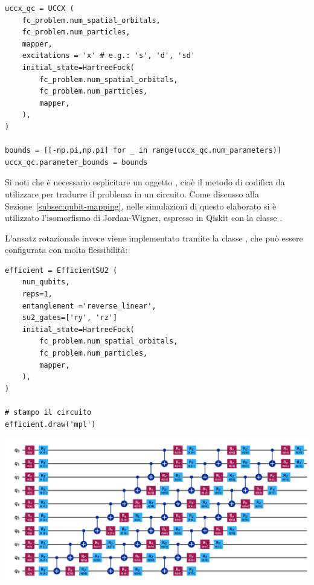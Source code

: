 \begin{tcolorbox}[title=Dichiarazione generico ansatz UCC$X$]
\begin{lstlisting}
uccx_qc = UCCX (
    fc_problem.num_spatial_orbitals,
    fc_problem.num_particles,
    mapper,
    excitations = 'x' # e.g.: 's', 'd', 'sd'
    initial_state=HartreeFock(
        fc_problem.num_spatial_orbitals,
        fc_problem.num_particles,
        mapper,
    ),
)

bounds = [[-np.pi,np.pi] for _ in range(uccx_qc.num_parameters)]
uccx_qc.parameter_bounds = bounds
\end{lstlisting}
\vspace{-0.2cm}
\end{tcolorbox}

Si noti che è necessario esplicitare un oggetto , cioè il metodo di codifica da utilizzare per tradurre il problema in un circuito. Come discusso alla Sezione~\ref{subsec:qubit-mapping}, nelle simulazioni di questo elaborato si è utilizzato l'isomorfismo di Jordan-Wigner, espresso in Qiskit con la classe .

L'ansatz rotazionale  invece viene implementato tramite la classe , che può essere configurata con molta flessibilità:

\begin{tcolorbox}[title=Dichiarazione ansatz hardware-efficient]
\begin{lstlisting}
efficient = EfficientSU2 (
    num_qubits, 
    reps=1,
    entanglement ='reverse_linear', 
    su2_gates=['ry', 'rz']
    initial_state=HartreeFock(
        fc_problem.num_spatial_orbitals,
        fc_problem.num_particles,
        mapper,
    ),
)

# stampo il circuito
efficient.draw('mpl')
\end{lstlisting}
\vspace{-0.5cm}
\begin{center}
    \hspace{-0.5cm}
    \includegraphics[width=\textwidth]{Immagini/Capitolo_3/efficient_circuit.png}
    \label{fig:efficient-circuit}
\end{center}
\end{tcolorbox}

